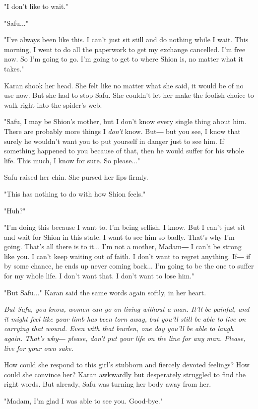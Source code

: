 "I don't like to wait."

"Safu..."

"I've always been like this. I can't just sit still and do nothing while
I wait. This morning, I went to do all the paperwork to get my exchange
cancelled. I'm free now. So I'm going to go. I'm going to get to where
Shion is, no matter what it takes."

Karan shook her head. She felt like no matter what she said, it would be
of no use now. But she had to stop Safu. She couldn't let her make the
foolish choice to walk right into the spider's web.

"Safu, I may be Shion's mother, but I don't know every single thing
about him. There are probably more things I \emph{don't} know. But― but you
see, I know that surely he wouldn't want you to put yourself in danger
just to see him. If something happened to you because of that, then he
would suffer for his whole life. This much, I know for sure. So
please..."

Safu raised her chin. She pursed her lips firmly.

"This has nothing to do with how Shion feels."

"Huh?"

"I'm doing this because I want to. I'm being selfish, I know. But I
can't just sit and wait for Shion in this state. I want to see him so
badly. That's why I'm going. That's all there is to it... I'm not a
mother, Madam― I can't be strong like you. I can't keep waiting out of
faith. I don't want to regret anything. If― if by some chance, he ends
up never coming back... I'm going to be the one to suffer for my whole
life. I don't want that. I don't want to lose him."

"But Safu..." Karan said the same words again softly, in her heart.

\emph{But Safu, you know, women can go on living without a man. It'll be
	painful, and it might feel like your limb has been torn away, but you'll
	still be able to live on carrying that wound. Even with that burden, one
	day you'll be able to laugh again. That's why― please, don't put your
	life on the line for any man. Please, live for your own sake.}

How could she respond to this girl's stubborn and fiercely devoted
feelings? How could she convince her? Karan awkwardly but desperately
struggled to find the right words. But already, Safu was turning her
body away from her.

"Madam, I'm glad I was able to see you. Good-bye."

